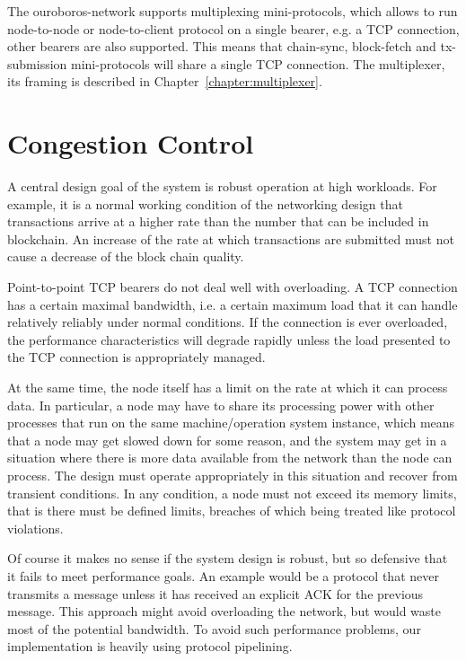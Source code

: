 The ouroboros-network supports multiplexing mini-protocols, which allows to run
node-to-node or node-to-client protocol on a single bearer, e.g. a TCP
connection, other bearers are also supported.  This means that chain-sync,
block-fetch and tx-submission mini-protocols will share a single TCP
connection.  The multiplexer, its framing is described in
Chapter~\ref{chapter:multiplexer}.

\section{Congestion Control}
A central design goal of the system is robust operation at high workloads.  For
example, it is a normal working condition of the networking design that
transactions arrive at a higher rate than the number that can be included in
blockchain.  An increase of the rate at which transactions are submitted must
not cause a decrease of the block chain quality.

Point-to-point TCP bearers do not deal well with overloading.  A TCP connection
has a certain maximal bandwidth, i.e. a certain maximum load that it can handle
relatively reliably under normal conditions.  If the connection is ever
overloaded, the performance characteristics will degrade rapidly unless the
load presented to the TCP connection is appropriately managed.

At the same time, the node itself has a limit on the rate at which it can
process data.  In particular, a node may have to share its processing power
with other processes that run on the same machine/operation system instance,
which means that a node may get slowed down for some reason, and the system may
get in a situation where there is more data available from the network than the
node can process.  The design must operate appropriately in this situation and
recover from transient conditions.  In any condition, a node must not exceed
its memory limits, that is there must be defined limits, breaches of which
being treated like protocol violations.

Of course it makes no sense if the system design is robust, but so defensive
that it fails to meet performance goals.  An example would be a protocol that
never transmits a message unless it has received an explicit ACK for the
previous message. This approach might avoid overloading the network, but would
waste most of the potential bandwidth.  To avoid such performance problems, our
implementation is heavily using protocol pipelining.


